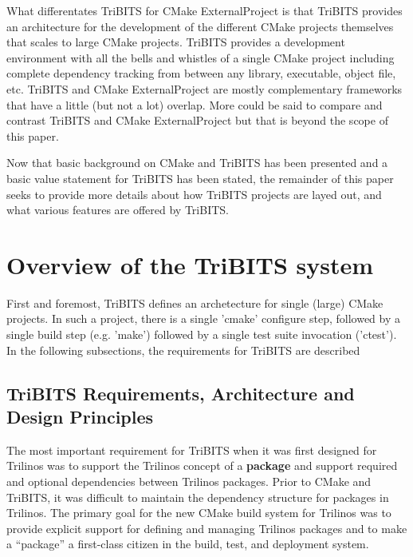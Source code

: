 \documentclass[note]{TechNote}
\begin{document}
What differentates TriBITS for CMake ExternalProject is that TriBITS provides an architecture for the development of the different CMake projects themselves that scales to large CMake projects.  TriBITS provides a development environment with all the bells and whistles of a single CMake project including complete dependency tracking from between any library, executable, object file, etc.  TriBITS and CMake ExternalProject are mostly complementary frameworks that have a little (but not a lot) overlap.  More could be said to compare and contrast TriBITS and CMake ExternalProject but that is beyond the scope of this paper.

Now that basic background on CMake and TriBITS has been presented and a basic value statement for TriBITS has been stated, the remainder of this paper seeks to provide more details about how TriBITS projects are layed out, and what various features are offered by TriBITS.

%
\section{Overview of the TriBITS system}
%

First and foremost, TriBITS defines an archetecture for single (large) CMake projects.  In such a project, there is a single 'cmake' configure step, followed by a single build step (e.g. 'make') followed by a single test suite invocation ('ctest').  In the following subsections, the requirements for TriBITS are described

%
\subsection{TriBITS Requirements, Architecture and Design Principles}
%

The most important requirement for TriBITS when it was first designed for Trilinos was to support the Trilinos concept of a \textbf{package} and support required and optional dependencies between Trilinos packages.  Prior to CMake and TriBITS, it was difficult to maintain the dependency structure for packages in Trilinos.  The primary goal for the new CMake build system for Trilinos was to provide explicit support for defining and managing Trilinos packages and to make a ``package'' a first-class citizen in the build, test, and deployment system.
\end{document}
